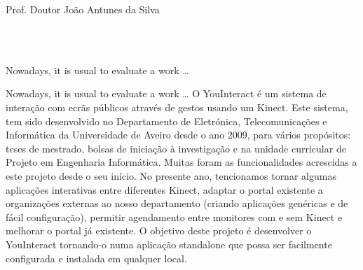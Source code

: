   \vspace*{5mm}    
{Prof. Doutor João Antunes da Silva 
\\ \\ 
\vspace*{5mm}

}


\EndTitlePage
\titlepage\
\endtitlepage %





\TitlePage
 \vspace*{55mm}
       {Nowadays, it is usual to evaluate a work \ldots}
\EndTitlePage
\titlepage\
\endtitlepage %




\TitlePage
  \vspace*{55mm}
       {Nowadays, it is usual to evaluate a work \ldots}
  \vspace*{5mm}
  \TEXT{\textbf{Resumo}}
       {O YouInteract é um sistema de interação com ecrãs públicos através de gestos usando um Kinect. Este sistema, tem sido desenvolvido no Departamento de Eletrónica, Telecomunicações e Informática da Universidade de Aveiro desde o ano 2009, para vários propósitos: teses de mestrado, bolsas de iniciação à investigação e na unidade curricular de Projeto em Engenharia Informática.}
	\TEXT{}
    {Muitas foram as funcionalidades acrescidas a este projeto desde o seu início. No presente ano, tencionamos tornar algumas aplicações interativas entre diferentes Kinect, adaptar o portal existente a organizações externas ao nosso departamento (criando aplicações genéricas e de fácil configuração), permitir agendamento entre monitores com e sem Kinect e melhorar o portal já existente.}  
	\TEXT{}     
   {O objetivo deste projeto é desenvolver o YouInteract tornando-o numa aplicação standalone que possa ser facilmente configurada e instalada em qualquer local. }


